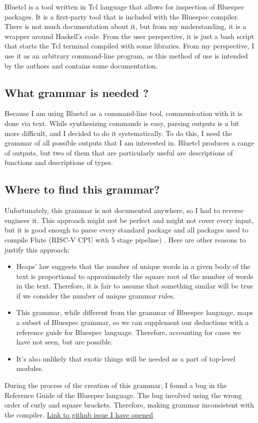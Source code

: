 \documentclass[12pt]{report}
\begin{document}
\begin{tcolorbox}[title=Bluetcl]  
  Bluetcl is a tool written in Tcl language that allows for inspection of Bluespec packages. It is a first-party tool that is included with the Bluespec compiler. There is not much documentation about it, but from my understanding, it is a wrapper around Haskell's code.  
  From the user perspective, it is just a bash script that starts the Tcl terminal compiled with some libraries. From my perspective, I use it as an arbitrary command-line program, as this method of use is intended by the authors and contains some documentation.  
\end{tcolorbox} 
\subsection{What grammar is needed ?}
Because I am using Bluetcl as a command-line tool, communication with it is done via text.  
While synthesizing commands is easy, parsing outputs is a bit more difficult, and I decided to do it systematically.  
To do this, I need the grammar of all possible outputs that I am interested in.  
Bluetcl produces a range of outputs, but two of them that are particularly useful are descriptions of functions and descriptions of types.  
\subsection{Where to find this grammar?}  
Unfortunately, this grammar is not documented anywhere, so I had to reverse engineer it. This approach might not be perfect and might not cover every input, but it is good enough to parse every standard package and all packages used to compile Flute (RISC-V CPU with 5 stage pipeline) \cite{Flute core}.  
Here are other reasons to justify this approach:  
\begin{itemize}  
   \item Heaps' law suggests that the number of unique words in a given body of the text is proportional to approximately the square root of the number of words in the text. Therefore, it is fair to assume that something similar will be true if we consider the number of unique grammar rules.  
   \item This grammar, while different from the grammar of Bluespec language, maps a subset of Bluespec grammar, so we can supplement our deductions with a reference guide for Bluespec language\cite{BscReference}. Therefore, accounting for cases we have not seen, but are possible.
   \item It's also unlikely that exotic things will be needed as a part of top-level modules. 
\end{itemize}
\begin{tcolorbox}
   During the process of the creation of this grammar, I found a bug in the Reference Guide of the Bluespec language. The bug involved using the wrong order of curly and square brackets. Therefore, making grammar inconsistent with the compiler. \href{https://github.com/BSVLang/Main/issues/6}{Link to github issue I have opened}
\end{tcolorbox}
\end{document}
